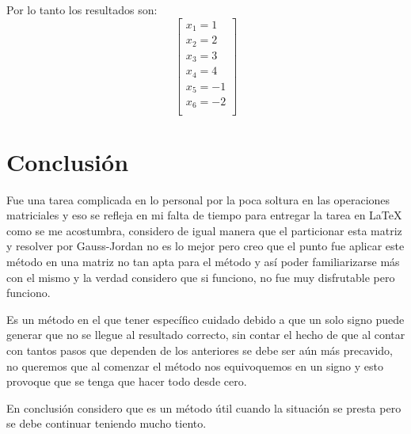 \documentclass{article}
\begin{document}
Por lo tanto los resultados son: 
$$
\begin{bmatrix}
    x_1 = 1 \\
    x_2 = 2 \\
    x_3 = 3 \\
    x_4 = 4 \\
    x_5 = -1 \\
    x_6 = -2 \\
\end{bmatrix}
$$

\section{Conclusión}
Fue una tarea complicada en lo personal por la poca soltura en las operaciones matriciales y eso se refleja en mi falta de tiempo para entregar la tarea en LaTeX como se me acostumbra, 
considero de igual manera que el particionar esta matriz y resolver por Gauss-Jordan no es lo mejor pero creo que el punto fue aplicar este método en una 
matriz no tan apta para el método y así poder familiarizarse más con el mismo y la verdad considero que si funciono, no fue muy disfrutable pero funciono. 

Es un método en el que tener específico cuidado debido a que un solo signo puede generar que no se llegue al resultado correcto, sin contar el hecho de que al contar con tantos 
pasos que dependen de los anteriores se debe ser aún más precavido, no queremos que al comenzar el método nos equivoquemos en un signo y esto provoque que se tenga que hacer todo desde cero. 

En conclusión considero que es un método útil cuando la situación se presta pero se debe continuar teniendo mucho tiento. 
\end{document}
